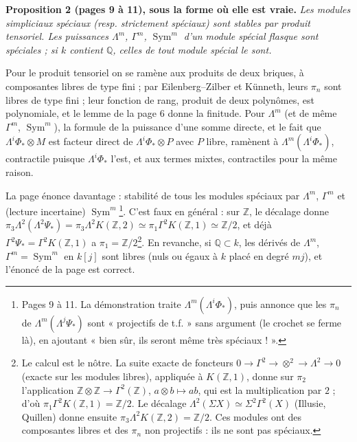 \documentclass[11pt,a4paper]{article}
\begin{document}
\textbf{Proposition 2 (pages 9 à 11), sous la forme où elle est vraie.}
\emph{Les modules simpliciaux spéciaux (resp. strictement spéciaux) sont
stables par produit tensoriel. Les puissances $\Lambda^{m}$, $\Gamma^{m}$,
$\operatorname{Sym}^{m}$ d'un module spécial \emph{flasque} sont spéciales ;
si $k$ contient $\mathbb{Q}$, celles de tout module spécial le sont.}

Pour le produit tensoriel on se ramène aux produits de deux briques, à
composantes libres de type fini ; par Eilenberg–Zilber et Künneth, leurs
$\pi_{n}$ sont libres de type fini ; leur fonction de rang, produit de deux
polynômes, est polynomiale, et le lemme de la page 6 donne la finitude. Pour
$\Lambda^{m}$ (et de même $\Gamma^{m}$, $\operatorname{Sym}^{m}$), la formule
de la puissance d'une somme directe, et le fait que $\Lambda^{i}\Phi_{*} \otimes M$ est facteur direct de $\Lambda^{i}\Phi_{*} \otimes P$ avec $P$ libre,
ramènent à $\Lambda^{m}(\Lambda^{i}\Phi_{*})$, contractile puisque
$\Lambda^{i}\Phi_{*}$ l'est, et aux termes mixtes, contractiles pour la même
raison.

La page énonce davantage : stabilité de tous les modules spéciaux par
$\Lambda^{m}$, $\Gamma^{m}$ et (lecture incertaine)
$\operatorname{Sym}^{m}$\footnote{Pages 9 à 11. La démonstration traite
$\Lambda^{m}(\Lambda^{i}\Phi_{*})$, puis annonce que les $\pi_{n}$ de
$\Lambda^{m}(\Lambda^{j}\Psi_{*})$ sont « projectifs de t.f. » sans
argument (le crochet se ferme là), en ajoutant « bien sûr, ils seront même
très spéciaux ! ».}. C'est faux en général : sur $\mathbb{Z}$, le décalage
donne $\pi_{3}\Lambda^{2}(\Lambda^{2}\Psi_{*}) = \pi_{3}\Lambda^{2}K(\mathbb{Z},2)
\simeq \pi_{1}\Gamma^{2}K(\mathbb{Z},1) \simeq \mathbb{Z}/2$, et déjà
$\Gamma^{2}\Psi_{*} = \Gamma^{2}K(\mathbb{Z},1)$ a $\pi_{1} =
\mathbb{Z}/2$\footnote{Le calcul est le nôtre. La suite exacte de foncteurs
$0 \to \Gamma^{2} \to \otimes^{2} \to \Lambda^{2} \to 0$ (exacte sur les
modules libres), appliquée à $K(\mathbb{Z},1)$, donne sur $\pi_{2}$
l'application $\mathbb{Z} \otimes \mathbb{Z} \to \Gamma^{2}(\mathbb{Z})$,
$a \otimes b \mapsto ab$, qui est la multiplication par $2$ ; d'où
$\pi_{1}\Gamma^{2}K(\mathbb{Z},1) = \mathbb{Z}/2$. Le décalage
$\Lambda^{2}(\Sigma X) \simeq \Sigma^{2}\Gamma^{2}(X)$ (Illusie, Quillen)
donne ensuite $\pi_{3}\Lambda^{2}K(\mathbb{Z},2) = \mathbb{Z}/2$. Ces
modules ont des composantes libres et des $\pi_{n}$ non projectifs : ils ne
sont pas spéciaux.}. En revanche, si $\mathbb{Q} \subset k$, les dérivés de
$\Lambda^{m}$, $\Gamma^{m} = \operatorname{Sym}^{m}$ en $k[j]$ sont libres
(nuls ou égaux à $k$ placé en degré $mj$), et l'énoncé de la page est
correct.
\end{document}
